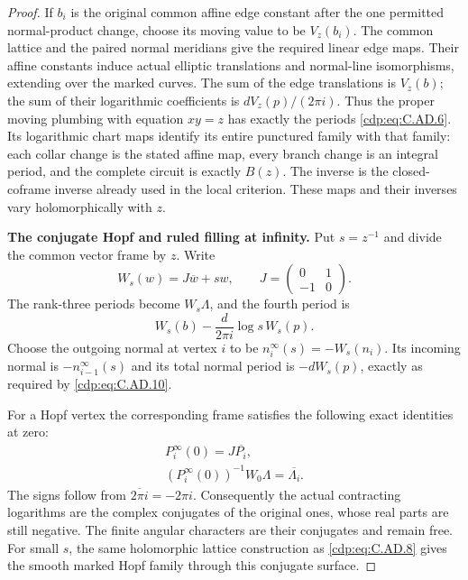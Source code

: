 \begin{proof}
If $b_i$ is the original common affine edge constant after
the one permitted normal-product change, choose its moving
value to be $V_z(b_i)$. The common lattice and the paired
normal meridians give the required linear edge maps. Their
affine constants induce actual elliptic translations and
normal-line isomorphisms, extending over the marked curves.
The sum of the edge translations is $V_z(b)$; the sum of
their logarithmic coefficients is $dV_z(p)/(2\pi i)$.
Thus the proper moving plumbing with equation $xy=z$ has
exactly the periods \eqref{cdp:eq:C.AD.6}. Its logarithmic chart maps
identify its entire punctured family with that family:
each collar change is the stated affine map, every branch
change is an integral period, and the complete circuit is
exactly $B(z)$. The inverse is the closed-coframe inverse
already used in the local criterion. These maps and their
inverses vary holomorphically with $z$.

\par\medskip\noindent\textbf{The conjugate Hopf and ruled filling at infinity.}
Put $s=z^{-1}$ and divide the common vector frame by $z$.
Write
\[
 W_s(w)=J\overline w+s w,\qquad
              J=\begin{pmatrix}0&1\\-1&0\end{pmatrix}.
                                                        \tag{C.AD.9}\label{cdp:eq:C.AD.9}
\]
The rank-three periods become $W_s\Lambda$, and the fourth
period is
\[
                 W_s(b)-\frac{d}{2\pi i}\log s\,W_s(p).
                                                        \tag{C.AD.10}\label{cdp:eq:C.AD.10}
\]
Choose the outgoing normal at vertex $i$ to be
$n_i^\infty(s)=-W_s(n_i)$. Its incoming normal is
$-n_{i-1}^\infty(s)$ and its total normal period is
$-dW_s(p)$, exactly as required by \eqref{cdp:eq:C.AD.10}.

For a Hopf vertex the corresponding frame satisfies the
following exact identities at zero:
\[
 \begin{gathered}
 P_i^\infty(0)=J\overline{P_i},\\
 (P_i^\infty(0))^{-1}W_0\Lambda
                         =\overline{\Lambda_i}.
 \end{gathered}                                        \tag{C.AD.11}\label{cdp:eq:C.AD.11}
\]
The signs follow from $\overline{2\pi i}=-2\pi i$.
Consequently the actual contracting logarithms are the
complex conjugates of the original ones, whose real parts
are still negative. The finite angular characters are
their conjugates and remain free. For small $s$, the same
holomorphic lattice construction as \eqref{cdp:eq:C.AD.8} gives the
smooth marked Hopf family through this conjugate surface.


\end{proof}
